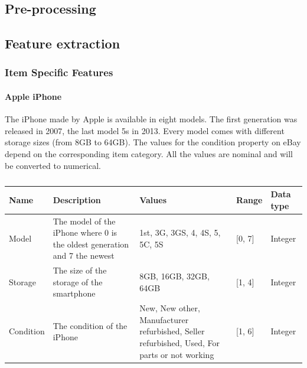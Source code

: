 \subsection{Pre-processing}
\subsection{Feature extraction}
\subsubsection{Item Specific Features}
\paragraph{Apple iPhone}
The iPhone made by Apple is available in eight models. The first generation was released in 2007, the last model 5s in 2013. Every model comes with different storage sizes (from 8GB to 64GB). The values for the condition property on eBay depend on the corresponding item category. All the values are nominal and will be converted to numerical.
\begin{table}[h!]
	\begin{center}
	\begin{tabular}{| l | p{5cm} | p{4cm} | l | l |}
		\hline
		Name & Description & Values & Range & Data type \\
		\hline
		Model & The model of the iPhone where 0 is the oldest generation and 7 the newest & 1st, 3G, 3GS, 4, 4S, 5, 5C, 5S & [0, 7] & Integer \\
		\hline
		Storage & The size of the storage of the smartphone & 8GB, 16GB, 32GB, 64GB & [1, 4] & Integer \\
		\hline
		Condition & The condition of the iPhone & New, New other, Manufacturer refurbished, Seller refurbished, Used, For parts or not working & [1, 6] & Integer \\
		\hline
	\end{tabular}
	\end{center}
	\caption{}
\end{table}

